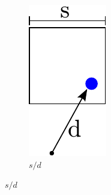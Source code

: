 \begin{figure}
 \centering
    \begin{subfigure}{0.15\columnwidth}
        \centering
        \includegraphics[width=\textwidth]{figures/mac_1}
        \caption{ $s/d$}
        \label{fig:tree:mac:1}
    \end{subfigure}

\end{figure}
